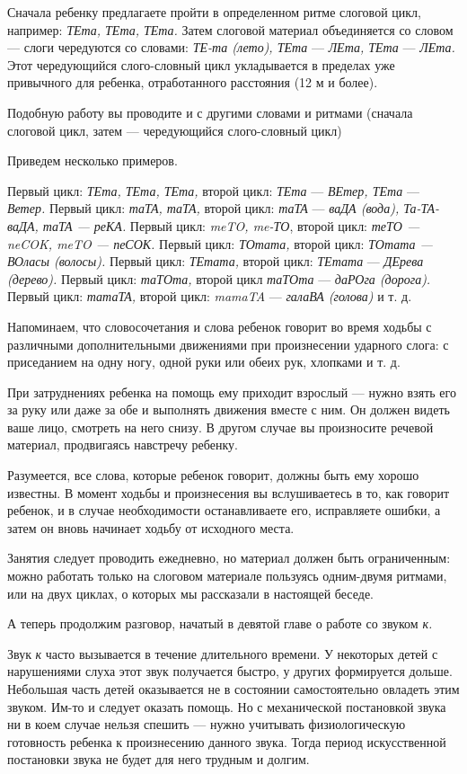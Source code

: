 \documentclass{book}
\renewcommand{\emph}[1]{\textit{#1}}
\begin{document}
Сначала ребенку предлагаете пройти в определенном ритме слоговой цикл,
например: \emph{ТЕта, ТЕта, ТЕта.} Затем слоговой материал объединяется
со словом --- слоги чередуются со словами: \emph{ТЕ-та (лето), ТЕта} ---
\emph{ЛЕта, ТЕта} --- \emph{ЛЕта.} Этот чередующийся слого-словный цикл
укладывается в пределах уже привычного для ребенка, отработанного
расстояния (12 м и более).

Подобную работу вы проводите и с другими словами и ритмами (сначала
слоговой цикл, затем --- чередующийся слого-словный цикл)

Приведем несколько примеров.

Первый цикл: \emph{ТЕта, ТЕта, ТЕта,} второй цикл: \emph{ТЕта} ---
\emph{ВЕтер, ТЕта} --- \emph{Ветер.} Первый цикл: \emph{таТА, таТА,}
второй цикл: \emph{таТА} --- \emph{ваДА (вода), Та-ТА-ваДА, таТА ---
реКА.} Первый цикл: \emph{meTO, me-ТО}, второй цикл: \emph{теТО ---
neCOK, meTO --- пеСОК.} Первый цикл: \emph{ТОтата,} второй цикл:
\emph{ТОтата --- ВОласы (волосы).} Первый цикл: \emph{ТЕтата,} второй
цикл: \emph{ТЕтата} --- \emph{ДЕрева (дерево).} Первый цикл:
\emph{таТОта,} второй цикл \emph{таТОта} --- \emph{даРОга (дорога).}
Первый цикл: \emph{татаТА,} второй цикл: \emph{mamaTA} --- \emph{галаВА
(голова)} и т. д.

Напоминаем, что словосочетания и слова ребенок говорит во время ходьбы с
различными дополнительными движениями при произнесении ударного слога: с
приседанием на одну ногу, одной руки или обеих рук, хлопками и т. д.

При затруднениях ребенка на помощь ему приходит взрослый --- нужно взять
его за руку или даже за обе и выполнять движения вместе с ним. Он должен
видеть ваше лицо, смотреть на него снизу. В другом случае вы произносите
речевой материал, продвигаясь навстречу ребенку.

Разумеется, все слова, которые ребенок говорит, должны быть ему хорошо
известны. В момент ходьбы и произнесения вы вслушиваетесь в то, как
говорит ребенок, и в случае необходимости останавливаете его,
исправляете ошибки, а затем он вновь начинает ходьбу от исходного места.

Занятия следует проводить ежедневно, но материал должен быть
ограниченным: можно работать только на слоговом материале пользуясь
одним-двумя ритмами, или на двух циклах, о которых мы рассказали в
настоящей беседе.

А теперь продолжим разговор, начатый в девятой главе о работе со звуком
\emph{к.}

Звук \emph{к} часто вызывается в течение длительного времени. У
некоторых детей с нарушениями слуха этот звук получается быстро, у
других формируется дольше. Небольшая часть детей оказывается не в
состоянии самостоятельно овладеть этим звуком. Им-то и следует оказать
помощь. Но с механической постановкой звука ни в коем случае нельзя
спешить --- нужно учитывать физиологическую готовность ребенка к
произнесению данного звука. Тогда период искусственной постановки звука
не будет для него трудным и долгим.
\end{document}

